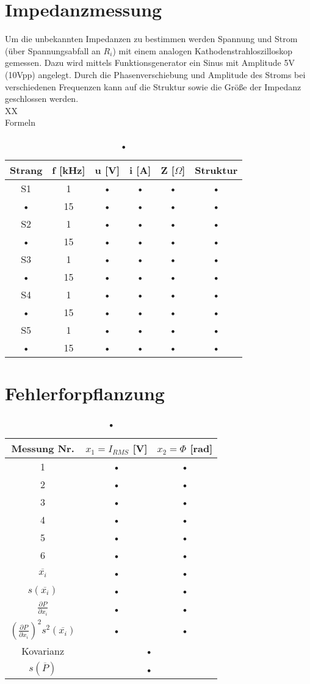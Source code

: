 \section{Impedanzmessung}
Um die unbekannten Impedanzen zu bestimmen werden Spannung und Strom (über Spannungsabfall an $R_i$) mit einem analogen Kathodenstrahloszilloskop gemessen. Dazu wird mittels Funktionsgenerator ein Sinus mit Amplitude 5V (10Vpp) angelegt. Durch die Phasenverschiebung und Amplitude des Stroms bei verschiedenen Frequenzen kann auf die Struktur sowie die Größe der Impedanz geschlossen werden. \\
XX \\
Formeln \\
\begin{table}[h]
	\centering
	\begin{tabular}{|c|c|c|c|c|c|}
	\hline 
	Strang & f [kHz] & u [V] & i [A] & Z [$\Omega$] & Struktur \\ 
	\hline 
	S1 & 1 & • & • & • & • \\ 
	\hline 
	• & 15 & • & • & • & • \\ 
	\hline 
	S2 & 1 & • & • & • & • \\ 
	\hline 
	• & 15 & • & • & • & • \\ 
	\hline 
	S3 & 1 & • & • & • & • \\ 
	\hline 
	• & 15 & • & • & • & • \\ 
	\hline 
	S4 & 1 & • & • & • & • \\ 
	\hline 
	• & 15 & • & • & • & • \\ 
	\hline 
	S5 & 1 & • & • & • & • \\ 
	\hline 
	• & 15 & • & • & • & • \\ 
	\hline 
	\end{tabular}
	\caption{•}
	\label{tb:imp}
\end{table}
\section{Fehlerforpflanzung}
\begin{table}
	\centering
	\begin{tabular}{|c||c|c|}
	\hline 
	Messung Nr. & $x_1 = I_{RMS}$ [V] & $x_2 = \Phi$ [rad] \\ 
	\hline 
	1 & • & • \\ 
	\hline 
	2 & • & • \\ 
	\hline 
	3 & • & • \\ 
	\hline 
	4 & • & • \\ 
	\hline 
	5 & • & • \\ 
	\hline 
	6 & • & • \\ 
	\hline 
	$\overline{x_i}$ & • & • \\ 
	\hline 
	$s(\overline{x_i})$ & • & • \\ 
	\hline 
	$\frac{\partial P}{\partial x_i}$ & • & • \\ 
	\hline 
	$(\frac{\partial P}{\partial x_i})^2 s^2(\overline{x_i})$ & • & • \\ 
	\hline 
	Kovarianz & \multicolumn{2}{c|}{•} \\ 
	\hline 
	$s (\overline{P})$ & \multicolumn{2}{c|}{•} \\ 
	\hline 
	\end{tabular} 
	\caption{•}
\end{table}
